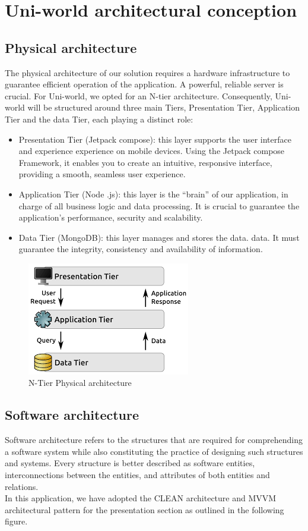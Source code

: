 \section{Uni-world architectural conception}
\subsection{Physical architecture}
The physical architecture of our solution requires a hardware infrastructure to guarantee efficient operation of the application. A powerful, reliable server is crucial. For Uni-world, we opted for an N-tier architecture.
Consequently, Uni-world will be structured around three main Tiers, Presentation Tier, Application Tier and the data Tier, each playing a distinct role:
\begin{itemize}
    \item Presentation Tier (Jetpack compose): this layer supports the user interface and experience
    experience on mobile devices. Using the Jetpack compose Framework, it enables you to
    create an intuitive, responsive interface, providing a smooth, seamless user
    experience.
    \item Application Tier (Node .js): this layer is the “brain” of our application, in charge of all business logic and data processing. It is crucial to guarantee the application's performance, security and scalability.
    \item Data Tier (MongoDB): this layer manages and stores the data.
    data. It must guarantee the integrity, consistency and availability of information.
\end{itemize}
\begin{figure}[H] 
            \centering
            \includegraphics[scale=0.9]{physical archi.png}
            \caption{N-Tier Physical architecture} 
            \label{fig: N-Tier Physical architecture}
\end{figure}
\subsection{Software architecture}
Software architecture refers to the structures that are required for comprehending a software system while also constituting the practice of designing such structures and systems. Every structure is better described as software entities, interconnections between the entities, and attributes of both entities and relations. \\
In this application, we have adopted the CLEAN architecture and MVVM architectural pattern for the presentation section as outlined in the following figure.

